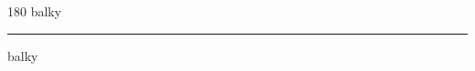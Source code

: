 
\begin{frame}
\begin{center}
\begin{turn}{180}
{\fontsize{2.5cm}{1em}\selectfont balky}
\end{turn}
\vspace{1em}\par  
\hrule
\vspace{1em}\par  
{\fontsize{2.5cm}{1em}\selectfont balky}
\end{center}
\end{frame}
